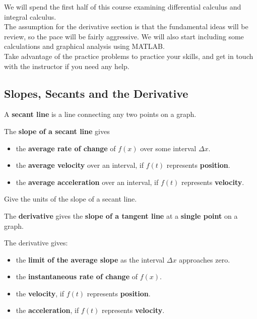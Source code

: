\newpage


\newpage

We will spend the first half of this course examining differential
calculus and integral calculus.  \\[2ex]

The assumption for the derivative section is that the fundamental
ideas will be review, so the pace will be fairly aggressive.  We will
also start including some calculations and graphical analysis using MATLAB.  \\[2ex]

Take advantage of the practice problems to practice your skills, and
get in touch with the instructor if you need any help.



\newpage
{}
\subsection*{Slopes, Secants and the Derivative}
A {\bf secant line} is a line connecting any two points on a graph.
\vfill

The {\bf slope of a secant line} gives 
\begin{itemize}
\item the {\bf average rate of change} of $f(x)$ over some interval $\Delta x$.
\item the {\bf average velocity} over an interval, if $f(t)$ represents {\bf position}.
\item the {\bf average acceleration} over an interval, if $f(t)$ represents {\bf velocity}.
\end{itemize}
\problem Give the units of the slope of a secant line.

\vspace{1in}

\newpage

The {\bf derivative} gives the {\bf slope of a tangent line} at a {\bf
  single point} on a graph.

\vfill

The derivative gives:
\begin{itemize}
\item the {\bf limit of the average slope} as the interval $\Delta x $ approaches zero.
\item the {\bf instantaneous rate of change} of $f(x)$.
\item the {\bf velocity}, if $f(t)$ represents {\bf position}.
\item the {\bf acceleration}, if $f(t)$ represents {\bf velocity}.
\end{itemize}

